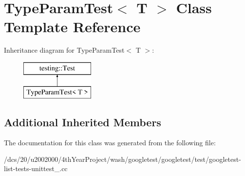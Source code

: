 \hypertarget{classTypeParamTest}{}\section{Type\+Param\+Test$<$ T $>$ Class Template Reference}
\label{classTypeParamTest}
Inheritance diagram for Type\+Param\+Test$<$ T $>$\+:\begin{figure}[H]
\begin{center}
\leavevmode
\includegraphics[height=2.000000cm]{classTypeParamTest}
\end{center}
\end{figure}
\subsection*{Additional Inherited Members}


The documentation for this class was generated from the following file\+:\begin{DoxyCompactItemize}
\item 
/dcs/20/u2002000/4th\+Year\+Project/wash/googletest/googletest/test/googletest-\/list-\/tests-\/unittest\+\_\+.\+cc\end{DoxyCompactItemize}
